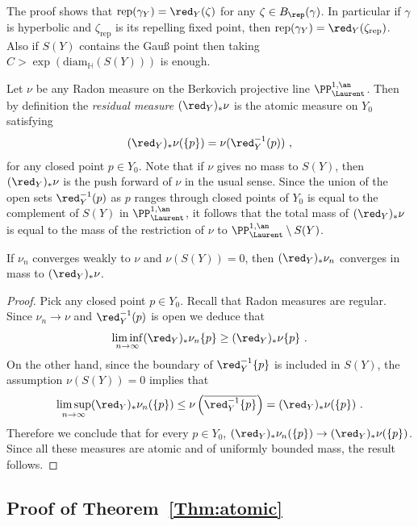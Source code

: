 \begin{rema}\label{rem:more precise}
The proof shows that $\mathrm{rep}(\gamma_Y) = \red_Y (\zeta)$ for any $\zeta \in B_{\rep}(\gamma)$. In particular if $\gamma$ is hyperbolic and $\zeta_{\mathrm{rep}}$ is its repelling fixed point, then $\mathrm{rep}(\gamma_Y) = \red_Y (\zeta_{\mathrm{rep}})$. Also if $S(Y)$ contains the Gau{\ss} point then taking $C > \exp (\mathrm{diam}_\mathbb{H} (S(Y)))$ is enough.
\end{rema}

Let $\nu$ be any Radon measure on the Berkovich projective line $\PP^{1,\an}_{\Laurent}$. Then by definition the \emph{residual measure} $(\red_Y)_* \nu$ is the atomic measure on $Y_0$ satisfying
\[
{(\red_Y)_* \nu} (\{ p \}) = \nu (\red_Y^{-1}(p))~,
\]
for any closed point $p\in Y_0$. Note that if $\nu$ gives no mass to $S(Y)$, then $(\red_Y)_* \nu$ is the push forward of $\nu$ in the usual sense. Since the union of the open sets $\red_Y^{-1}(p)$ as $p$ ranges through closed points of $Y_0$ is equal to the complement of $S(Y)$ in $\PP^{1,\an}_{\Laurent}$, it follows that the total mass of $(\red_Y)_* \nu$ is equal to the mass of the restriction of $\nu$ to $\PP^{1,\an}_{\Laurent}\setminus S(Y)$.

\begin{lemm}\label{lem:cvg mass}
If $\nu_n$ converges weakly to $\nu$ and $\nu(S(Y)) =0$, then $(\red_Y)_* \nu_n$ converges in mass to $(\red_Y)_* \nu$.
\end{lemm}

\begin{proof}
Pick any closed point $p\in Y_0$. Recall that Radon measures are regular. Since $\nu_n \to \nu$ and $\red_Y^{-1}(p)$ is open we deduce that
\[
\liminf_{n\to\infty} (\red_Y)_* \nu_n \{ p \} \ge (\red_Y)_* \nu \{ p \}~.
\]
On the other hand, since the boundary of $\red_Y^{-1} \{ p \}$ is included in $S(Y)$, the assumption $\nu(S(Y)) =0$ implies that
\[
\limsup_{n\to\infty} (\red_Y)_* \nu_n (\{ p \}) \le \nu \left(\overline{ \red_Y^{-1} \{ p \}} \right) = (\red_Y)_* \nu (\{ p \})~.
\]
Therefore we conclude that for every $p\in Y_0$, $(\red_Y)_* \nu_n(\{p \}) \to (\red_Y)_* \nu (\{p\})$. Since all these measures are atomic and of uniformly bounded mass, the result follows.
\end{proof}

\subsection{Proof of Theorem~\ref{Thm:atomic}}\label{subs:atomic}

